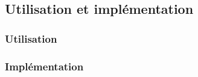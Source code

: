   \subsection{Utilisation et implémentation}
  \begin{frame}
   \frametitle{Utilisation}




  \end{frame}
 
  \begin{frame}
   \frametitle{Implémentation}




  \end{frame}
  